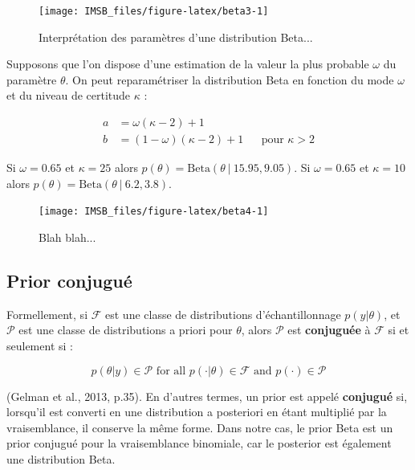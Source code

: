 \documentclass[
  a4paper,11pt,twoside,onecolumn,openright,final,oldfontcommands]{memoir}
\theoremstyle{definition}
\theoremstyle{definition}
\theoremstyle{definition}
\theoremstyle{definition}
\theoremstyle{remark}
\begin{document}
\begin{figure}[!htb]

{\centering \texttt{[image: IMSB\_files/figure-latex/beta3-1]} 

}

\caption{Interprétation des paramètres d'une distribution Beta...}\label{fig:beta3}
\end{figure}

Supposons que l'on dispose d'une estimation de la valeur la plus probable \(\omega\) du paramètre \(\theta\). On peut reparamétriser la distribution Beta en fonction du mode \(\omega\) et du niveau de certitude \(\kappa\) :

\[
\begin{aligned}
a &= \omega(\kappa - 2) + 1 \\
b &= (1 - \omega)(\kappa - 2) + 1 &&\mbox{pour } \kappa > 2
\end{aligned}
\]

Si \(\omega = 0.65\) et \(\kappa = 25\) alors \(p(\theta) = \mathrm{Beta}(\theta \ | \ 15.95, 9.05)\).
Si \(\omega = 0.65\) et \(\kappa = 10\) alors \(p(\theta) = \mathrm{Beta}(\theta \ | \ 6.2, 3.8)\).

\begin{figure}[!htb]

{\centering \texttt{[image: IMSB\_files/figure-latex/beta4-1]} 

}

\caption{Blah blah...}\label{fig:beta4}
\end{figure}

\hypertarget{prior-conjuguuxe9}{%
\subsection{Prior conjugué}\label{prior-conjuguuxe9}}

Formellement, si \(\mathcal{F}\) est une classe de distributions d'échantillonnage \(p(y|\theta)\), et \(\mathcal{P}\) est une classe de distributions a priori pour \(\theta\), alors \(\mathcal{P}\) est \textbf{conjuguée} à \(\mathcal{F}\) si et seulement si :

\[
p(\theta|y) \in \mathcal{P} \text{ for all } p(\cdot | \theta) \in \mathcal{F} \text{ and } p(\cdot) \in \mathcal{P}
\]

(Gelman et al., 2013, p.35). En d'autres termes, un prior est appelé \textbf{conjugué} si, lorsqu'il est converti en une distribution a posteriori en étant multiplié par la vraisemblance, il conserve la même forme. Dans notre cas, le prior Beta est un prior conjugué pour la vraisemblance binomiale, car le posterior est également une distribution Beta.
\end{document}
